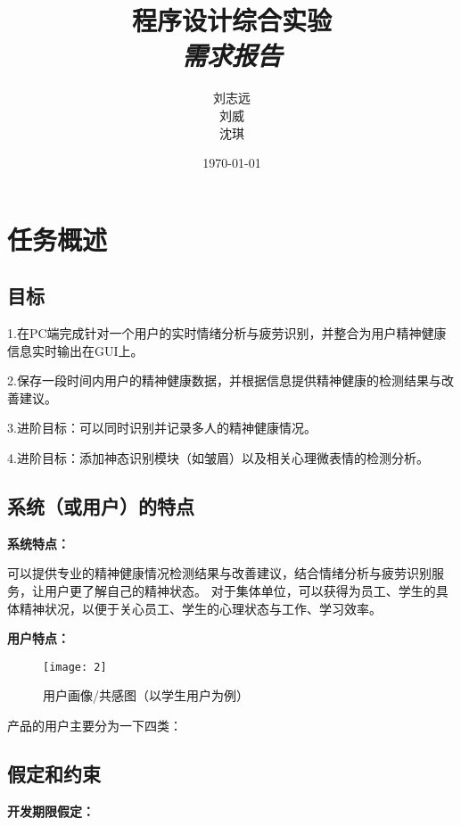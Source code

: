 \documentclass[a4paper]{ctexart}%
\title{\textbf{\Huge 程序设计综合实验}
	\\ \textit{\huge 需求报告} }
\author{刘志远\quad 2020212174\\
刘威\quad 2020212172\\
沈琪\quad 2020212178}
\date{\today}
\begin{document}
	\maketitle
	\tableofcontents
	\newpage
	\section{任务概述}
	\subsection{目标}
	
	1.在PC端完成针对一个用户的实时情绪分析与疲劳识别，并整合为用户精神健康信息实时输出在GUI上。
	
	2.保存一段时间内用户的精神健康数据，并根据信息提供精神健康的检测结果与改善建议。
	
	3.进阶目标：可以同时识别并记录多人的精神健康情况。
	
	4.进阶目标：添加神态识别模块（如皱眉）以及相关心理微表情的检测分析。
	\subsection{系统（或用户）的特点 }
	\textbf{系统特点：}
		
	可以提供专业的精神健康情况检测结果与改善建议，结合情绪分析与疲劳识别服务，让用户更了解自己的精神状态。
	对于集体单位，可以获得为员工、学生的具体精神状况，以便于关心员工、学生的心理状态与工作、学习效率。
	
	\textbf{用户特点：}
	
	\begin{figure}[h]
		\centering
		\texttt{[image: 2]}
		\caption{用户画像/共感图（以学生用户为例）}
	\end{figure}
	
	产品的用户主要分为一下四类：
	
	\subsection{假定和约束}
	\textbf{开发期限假定：}
	
\end{document}
